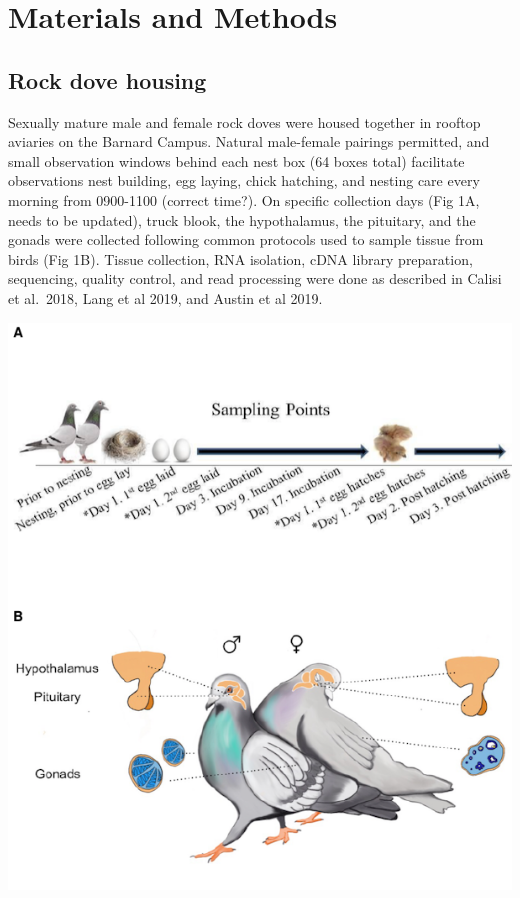 \documentclass[10pt,letterpaper]{article}
\begin{document}
\hypertarget{materials-and-methods}{%
\section{Materials and Methods}\label{materials-and-methods}}

\hypertarget{rock-dove-housing}{%
\subsection{Rock dove housing}\label{rock-dove-housing}}

Sexually mature male and female rock doves were housed together in
rooftop aviaries on the Barnard Campus. Natural male-female pairings
permitted, and small observation windows behind each nest box (64 boxes
total) facilitate observations nest building, egg laying, chick
hatching, and nesting care every morning from 0900-1100 (correct time?).
On specific collection days (Fig 1A, needs to be updated), truck blook,
the hypothalamus, the pituitary, and the gonads were collected following
common protocols used to sample tissue from birds (Fig 1B). Tissue
collection, RNA isolation, cDNA library preparation, sequencing, quality
control, and read processing were done as described in Calisi et
al.~2018, Lang et al 2019, and Austin et al 2019.

\includegraphics{characterization_manuscript_files/figure-latex/unnamed-chunk-2-1.pdf}
\end{document}
